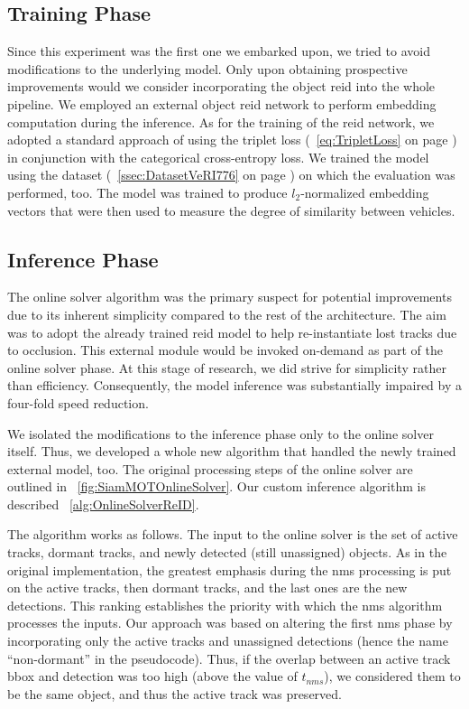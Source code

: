 \subsection{Training Phase}

Since this experiment was the first one we embarked upon, we tried to avoid modifications to the underlying model. Only upon obtaining prospective improvements would we consider incorporating the object \gls{reid} into the whole pipeline. We employed an external object \gls{reid} network to perform embedding computation during the inference. As for the training of the \gls{reid} network, we adopted a standard approach of using the triplet loss (\eqtext{}~\ref{eq:TripletLoss} on page \pageref{eq:TripletLoss}) in conjunction with the categorical cross-entropy loss. We trained the model using the \verisss{} dataset (\sectiontext{}~\ref{ssec:DatasetVeRI776} on page \pageref{ssec:DatasetVeRI776}) on which the evaluation was performed, too. The model was trained to produce $l_2$-normalized embedding vectors that were then used to measure the degree of similarity between vehicles.

\subsection{Inference Phase}

The online solver algorithm was the primary suspect for potential improvements due to its inherent simplicity compared to the rest of the architecture. The aim was to adopt the already trained \gls{reid} model to help re-instantiate lost tracks due to occlusion. This external module would be invoked on-demand as part of the online solver phase. At this stage of research, we did strive for simplicity rather than efficiency. Consequently, the model inference was substantially impaired by a four-fold speed reduction.

We isolated the modifications to the inference phase only to the online solver itself. Thus, we developed a whole new algorithm that handled the newly trained external model, too. The original processing steps of the online solver are outlined in \figtext{}~\ref{fig:SiamMOTOnlineSolver}. Our custom inference algorithm is described \algtext{}~\ref{alg:OnlineSolverReID}.

The algorithm works as follows. The input to the online solver is the set of active tracks, dormant tracks, and newly detected (still unassigned) objects. As in the original implementation, the greatest emphasis during the \gls{nms} processing is put on the active tracks, then dormant tracks, and the last ones are the new detections. This ranking establishes the priority with which the \gls{nms} algorithm processes the inputs. Our approach was based on altering the first \gls{nms} phase by incorporating only the active tracks and unassigned detections (hence the name ``non-dormant'' in the pseudocode). Thus, if the overlap between an active track \gls{bbox} and detection was too high (above the value of $t_{nms}$), we considered them to be the same object, and thus the active track was preserved.


